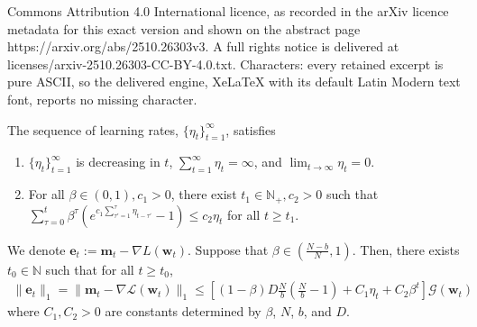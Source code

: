 \documentclass[10pt,a4paper]{amsart}
\def\be{{\mathbf e}}
\def\bm{{\mathbf m}}
\def\bw{{\mathbf w}}
\def\gG{{\mathcal{G}}}
\def\sN{{\mathbb{N}}}
\newcommand{\Ls}{\mathcal{L}}
\begin{document}
Commons Attribution 4.0 International licence, as recorded in the arXiv licence metadata for this exact version and shown on the abstract page https://arxiv.org/abs/2510.26303v3. A full rights notice is delivered at licenses/arxiv-2510.26303-CC-BY-4.0.txt. Characters: every retained excerpt is pure ASCII, so the delivered engine, XeLaTeX with its default Latin Modern text font, reports no missing character.
\begin{assumption}\label{ass:lr}
The sequence of learning rates, $\{\eta_t\}_{t=1}^\infty$, satisfies
\begin{enumerate}[label=(\alph*)]
    \item $\{\eta_t\}_{t=1}^\infty$ is decreasing in $t$, $\sum_{t=1}^\infty \eta_t = \infty$, and $\lim_{t \rightarrow \infty} \eta_t = 0$.
    \item For all $\beta \in (0,1), c_1>0$, there exist $t_1 \in \sN_+, c_2 > 0$ such that $\sum_{\tau=0}^t\beta^\tau(e^{c_1\sum_{\tau'=1}^\tau \eta_{t - \tau'}}-1) \leq c_2 \eta_t$ for all $t \geq t_1$.
\end{enumerate}
\end{assumption}

\begin{lemma}\label{lemma:ema_misalign}
    We denote $\be_t:=\bm_t - \nabla L(\bw_t)$. Suppose that $\beta \in (\frac{N-b}{N}, 1)$. Then, there exists $t_0\in \mathbb N$ such that for all $t\geq t_0$,
    \begin{align*}
        \|\be_t\|_1 = \|\bm_t - \nabla \Ls(\bw_t)\|_1 \leq \left[ (1-\beta)D \tfrac Nb (\tfrac Nb -1) + C_1\eta_t + C_2 \beta^t \right] \gG(\bw_t)
    \end{align*}
    where $C_1, C_2 > 0$ are constants determined by $\beta$, $N$, $b$, and $D$.
\end{lemma}
\end{document}
